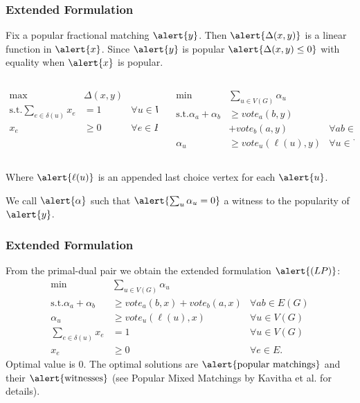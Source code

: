 \documentclass[10pt]{beamer}
\begin{document}
\begin{frame}
\frametitle{Extended Formulation}
Fix a popular fractional matching $\alert{y}$. Then $\alert{\Delta(x,y)}$ is a linear function in $\alert{x}$. Since $\alert{y}$ is popular $\alert{\Delta(x,y) \leq 0}$ with equality when $\alert{x}$ is popular.
\begin{columns}[T]
\begin{column}{.48\textwidth}
\begin{align*}
\max &\Delta(x,y) \\
\text{s.t.} \sum_{e \in \delta(u)} x_e &= 1 &\forall u \in V(G) \\
x_e &\geq 0 &\forall e \in E
\end{align*}
\end{column}
\begin{column}{.48\textwidth}
\begin{align*}
\min &\sum_{u \in V(G)} \alpha_u  \\
\text{s.t.} \alpha_a + \alpha_b &\geq vote_a(b,y) \\&+ vote_b(a,y) &\forall ab \in E(G) \\
\alpha_u &\geq vote_u(\ell(u), y) &\forall u \in V(G).
\end{align*}
\end{column}
\end{columns}
Where $\alert{\ell(u)}$ is an appended last choice vertex for each $\alert{u}$.

We call $\alert{\alpha}$ such that $\alert{\sum_{u} \alpha_u = 0}$ a witness to the popularity of $\alert{y}$.
\end{frame}

\begin{frame}
\frametitle{Extended Formulation}
From the primal-dual pair we obtain the extended formulation $\alert{(LP)}$:
\begin{align*}
\min &\sum_{u \in V(G)} \alpha_u \\
\text{s.t.} \alpha_a + \alpha_b &\geq vote_a(b,x) + vote_b(a,x) &\forall ab \in E(G) \\
\alpha_u &\geq vote_u(\ell(u),x) &\forall u \in V(G) \\
\sum_{e \in \delta(u)} x_e &=1 &\forall u \in V(G) \\
x_e &\geq 0 &\forall e \in E.
\end{align*}
Optimal value is $0$. The optimal solutions are $\text{\alert{popular matchings}}$ and their $\text{\alert{witnesses}}$ (see Popular Mixed Matchings by Kavitha et al. for details).
\end{frame}
\end{document}
